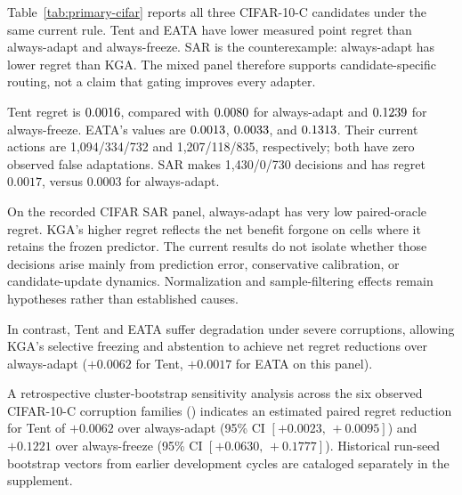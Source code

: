 Table~\ref{tab:primary-cifar} reports all three CIFAR-10-C candidates under the same current rule.
Tent and EATA have lower measured point regret than always-adapt and always-freeze.
SAR is the counterexample: always-adapt has lower regret than KGA. The mixed panel therefore
supports candidate-specific routing, not a claim that gating improves every adapter.

\begin{table}[t]
\centering
\footnotesize
\caption{Primary controlled CIFAR-10-C results. Regret is the mean accuracy shortfall from the
per-cell oracle, on the proportion scale; lower is better. A/F/U denotes ADAPT/FREEZE/ABSTAIN.
Commitment rate is $(A+F)/n$, not interval coverage. Cells share checkpoints and residual pools.}
\label{tab:primary-cifar}
\resizebox{\textwidth}{!}{}
\end{table}

Tent regret is $0.0016$, compared with $0.0080$ for always-adapt and
$0.1239$ for always-freeze. EATA's values are $0.0013$,
$0.0033$, and $0.1313$. Their current actions are 1,094/334/732 and
1,207/118/835, respectively; both have zero observed false adaptations.
SAR makes 1,430/0/730 decisions and has regret $0.0017$, versus $0.0003$ for always-adapt.

On the recorded CIFAR SAR panel, always-adapt has very low paired-oracle regret. KGA's higher regret
reflects the net benefit forgone on cells where it retains the frozen predictor. The current results
do not isolate whether those decisions arise mainly from prediction error, conservative calibration,
or candidate-update dynamics. Normalization and sample-filtering effects remain hypotheses rather than
established causes.

In contrast, Tent and EATA suffer degradation under severe corruptions, allowing KGA's selective
freezing and abstention to achieve net regret reductions over always-adapt ($+0.0062$ for Tent,
$+0.0017$ for EATA on this panel).

A retrospective cluster-bootstrap sensitivity analysis across the six observed CIFAR-10-C corruption
families ()
indicates an estimated paired regret reduction for Tent of $+0.0062$ over always-adapt
(95\% CI $[+0.0023,\,+0.0095]$) and $+0.1221$ over always-freeze (95\% CI $[+0.0630,\,+0.1777]$).
Historical run-seed bootstrap vectors from earlier development cycles are cataloged separately in the supplement.

